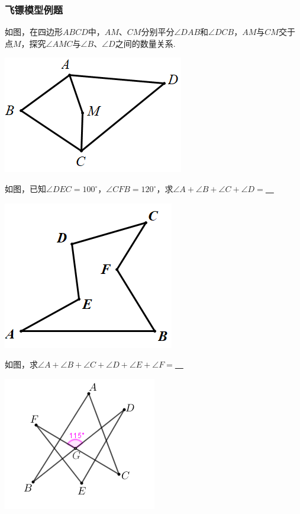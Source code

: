\subsubsection{飞镖模型例题}
\begin{example}
如图，在四边形$ABCD$中，$AM$、$CM$分别平分$\angle DAB$和$\angle DCB$，$AM$与$CM$交于点$M$，探究$\angle AMC$与$\angle B$、$\angle D$之间的数量关系.
\end{example}
 \includegraphics[scale=0.5]{figure/feibiao04.PNG}
 
\begin{example}
如图，已知$\angle DEC=100^\circ$，$\angle CFB=120^\circ$，求$\angle A+\angle B+\angle C+\angle D=$\underline{~\hspace{1cm}~}
\end{example}

 \includegraphics[scale=0.5]{figure/feibiao05.PNG}

\begin{example}
如图，求$\angle A+\angle B+\angle C+\angle D+\angle E+\angle F=$\underline{~\hspace{1cm}~}
\end{example}

 \includegraphics[scale=0.5]{figure/feibiao06.PNG}

